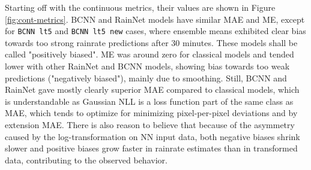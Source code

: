 Starting off with the continuous metrics, their values are shown in Figure \ref{fig:cont-metrics}. BCNN and RainNet models have similar MAE and ME, except for \texttt{BCNN lt5} and \texttt{BCNN lt5 new} cases, where ensemble means exhibited clear bias towards too strong rainrate predictions after 30 minutes. These models shall be called "positively biased". ME was around zero for classical models and tended lower with other RainNet and BCNN models, showing bias towards too weak predictions ("negatively biased"), mainly due to smoothing. Still, BCNN and RainNet gave mostly clearly superior MAE compared to classical models, which is understandable as Gaussian NLL is a loss function part of the same class as MAE, which tends to optimize for minimizing pixel-per-pixel deviations and by extension MAE. There is also reason to believe that because of the asymmetry caused by the log-transformation on NN input data, both negative biases shrink slower and positive biases grow faster in rainrate estimates than in transformed data, contributing to the observed behavior.

